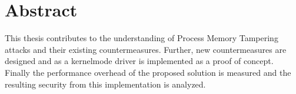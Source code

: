 \newpage
\thispagestyle{empty}
\section*{Abstract}
This thesis contributes to the understanding of Process Memory Tampering attacks and their existing countermeasures. Further, new countermeasures are designed and as a kernelmode driver is implemented as a proof of concept. Finally the performance overhead of the proposed solution is measured and the resulting security from this implementation is analyzed.